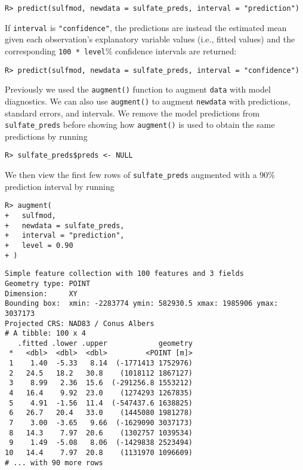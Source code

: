 \documentclass[10pt,letterpaper]{article}
\begin{document}
\begin{verbatim}
R> predict(sulfmod, newdata = sulfate_preds, interval = "prediction")
\end{verbatim}

If \texttt{interval} is \texttt{"confidence"}, the predictions are
instead the estimated mean given each observation's explanatory variable
values (i.e., fitted values) and the corresponding
\texttt{100\ *\ level}\% confidence intervals are returned:

\begin{verbatim}
R> predict(sulfmod, newdata = sulfate_preds, interval = "confidence")
\end{verbatim}

Previously we used the \texttt{augment()} function to augment
\texttt{data} with model diagnostics. We can also use \texttt{augment()}
to augment \texttt{newdata} with predictions, standard errors, and
intervals. We remove the model predictions from \texttt{sulfate\_preds}
before showing how \texttt{augment()} is used to obtain the same
predictions by running

\begin{verbatim}
R> sulfate_preds$preds <- NULL
\end{verbatim}

We then view the first few rows of \texttt{sulfate\_preds} augmented
with a 90\% prediction interval by running

\begin{verbatim}
R> augment(
+   sulfmod,
+   newdata = sulfate_preds,
+   interval = "prediction",
+   level = 0.90
+ )
\end{verbatim}

\begin{verbatim}
Simple feature collection with 100 features and 3 fields
Geometry type: POINT
Dimension:     XY
Bounding box:  xmin: -2283774 ymin: 582930.5 xmax: 1985906 ymax: 3037173
Projected CRS: NAD83 / Conus Albers
# A tibble: 100 x 4
   .fitted .lower .upper            geometry
 *   <dbl>  <dbl>  <dbl>         <POINT [m]>
 1    1.40  -5.33   8.14  (-1771413 1752976)
 2   24.5   18.2   30.8    (1018112 1867127)
 3    8.99   2.36  15.6  (-291256.8 1553212)
 4   16.4    9.92  23.0    (1274293 1267835)
 5    4.91  -1.56  11.4  (-547437.6 1638825)
 6   26.7   20.4   33.0    (1445080 1981278)
 7    3.00  -3.65   9.66  (-1629090 3037173)
 8   14.3    7.97  20.6    (1302757 1039534)
 9    1.49  -5.08   8.06  (-1429838 2523494)
10   14.4    7.97  20.8    (1131970 1096609)
# ... with 90 more rows
\end{verbatim}
\end{document}
